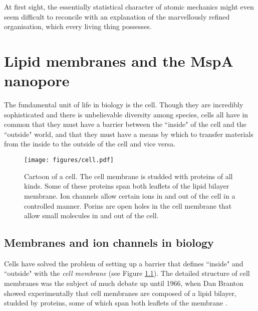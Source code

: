 \begin{savequote}[75mm]
At first sight, the essentially statistical character of atomic mechanics might even seem difficult to reconcile with an explanation of the marvellously refined organisation, which every living thing possesses.
\end{savequote}

\chapter{Lipid membranes and the MspA nanopore}
\label{lipids_mspa}

The fundamental unit of life in biology is the cell.  Though they are incredibly sophisticated and there is unbelievable diversity among species, cells all have in common that they must have a barrier between the ``inside" of the cell and the ``outside" world, and that they must have a means by which to transfer materials from the inside to the outside of the cell and vice versa.

\begin{figure}[h]
\begin{centering}
\texttt{[image: figures/cell.pdf]}
\caption[Ion channels in cells]{Cartoon of a cell.  The cell membrane is studded with proteins of all kinds.  Some of these proteins span both leaflets of the lipid bilayer membrane.  Ion channels allow certain ions in and out of the cell in a controlled manner.  Porins are open holes in the cell membrane that allow small molecules in and out of the cell.}
\label{fig:ion_channels}
\end{centering}
\end{figure}

\section{Membranes and ion channels in biology}

Cells have solved the problem of setting up a barrier that defines ``inside" and ``outside" with the \textit{cell membrane} (see Figure \ref{fig:ion_channels}).  The detailed structure of cell membranes was the subject of much debate up until 1966, when Dan Branton showed experimentally that cell membranes are composed of a lipid bilayer, studded by proteins, some of which span both leaflets of the membrane \citep{Branton1966,Branton2016}.

